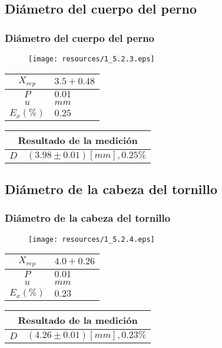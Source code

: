 \documentclass[letter,11pt]{beamer}
\begin{document}
\subsection{Diámetro del cuerpo del perno}
\begin{frame}
\frametitle{Diámetro del cuerpo del perno}
\vspace*{0.8cm}
\begin{figure}
\centering
\texttt{[image: resources/1\_5.2.3.eps]}
\end{figure}
\vspace*{0.4cm}
\scriptsize
\begin{tabular}{|c|>{\centering}m{1.8cm}<{\centering}|}
\hline
$X_{rep}$ &  $3.5+0.48$ \tabularnewline \hline
      $P$ &      $0.01$ \tabularnewline \hline
      $u$ &        $mm$ \tabularnewline \hline
$E_x(\%)$ &      $0.25$ \tabularnewline \hline
\end{tabular}
\quad
\begin{tabular}{|c|>{\centering}m{5.7cm}<{\centering}|}
\hline
\multicolumn{2}{|c|}{\textbf{Resultado de la medición}} \\ \hline
$D$ & $( 3.98\pm0.01)[mm], 0.25\%$ \tabularnewline \hline
\end{tabular}
\end{frame}

\subsection{Diámetro de la cabeza del tornillo}
\begin{frame}
\frametitle{Diámetro de la cabeza del tornillo}
\vspace*{0.8cm}
\begin{figure}
\centering
\texttt{[image: resources/1\_5.2.4.eps]}
\end{figure}
\vspace*{0.4cm}
\scriptsize
\begin{tabular}{|c|>{\centering}m{1.8cm}<{\centering}|}
\hline
$X_{rep}$ &  $4.0+0.26$ \tabularnewline \hline
      $P$ &      $0.01$ \tabularnewline \hline
      $u$ &        $mm$ \tabularnewline \hline
$E_x(\%)$ &      $0.23$ \tabularnewline \hline
\end{tabular}
\quad
\begin{tabular}{|c|>{\centering}m{5.7cm}<{\centering}|}
\hline
\multicolumn{2}{|c|}{\textbf{Resultado de la medición}} \\ \hline
$D$ & $( 4.26\pm0.01)[mm], 0.23\%$ \tabularnewline \hline
\end{tabular}
\end{frame}
\end{document}
